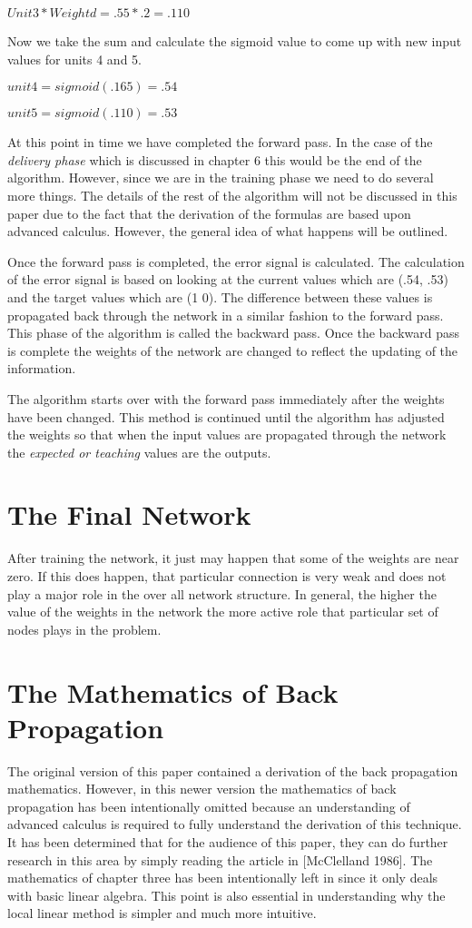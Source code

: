 	$Unit 3 * Weight d = .55 * .2 = .110$

	Now we take the sum and calculate the sigmoid value to come up
with new input values for units 4 and 5.

	$unit 4 = sigmoid(.165) = .54$

	$unit 5 = sigmoid(.110) = .53$

	At this point in time we have completed the forward pass.  In
the case of the {\it delivery phase} which is discussed in chapter 6
this would be the end of the algorithm.  However, since we are in the
training phase we need to do several more things.  The details of the
rest of the algorithm will not be discussed in this paper due to the
fact that the derivation of the formulas are based upon advanced
calculus.  However, the general idea of what happens will be outlined.

	Once the forward pass is completed, the error signal is
calculated.  The calculation of the error signal is based on looking
at the current values which are (.54, .53) and the target values
which are (1 0).  The difference between these values is propagated
back through the network in a similar fashion to the forward pass.
This phase of the algorithm is called the backward pass.  Once the
backward pass is complete the weights of the network are changed to
reflect the updating of the information.  

	The algorithm starts over with the forward pass immediately
after the weights have been changed.  This method is continued until
the algorithm has adjusted the weights so that when the input values
are propagated through the network the {\it expected or teaching}
values are the outputs.

\section{The Final Network}

	After training the network, it just may happen that some of
the weights are near zero. If this does happen, that particular
connection is very weak and does not play a major role in the over all
network structure.  In general, the higher the value of the weights in
the network the more active role that particular set of nodes plays in
the problem.

\section{The Mathematics of Back Propagation}

	The original version of this paper contained a derivation of
the back propagation mathematics.  However, in this newer version the
mathematics of back propagation has been intentionally omitted because
an understanding of advanced calculus is required to fully understand
the derivation of this technique.  It has been determined that for the
audience of this paper, they can do further research in this area by
simply reading the article in [McClelland 1986].  The mathematics of
chapter three has been intentionally left in since it only deals with
basic linear algebra.  This point is also essential in understanding
why the local linear method is simpler and much more intuitive.


